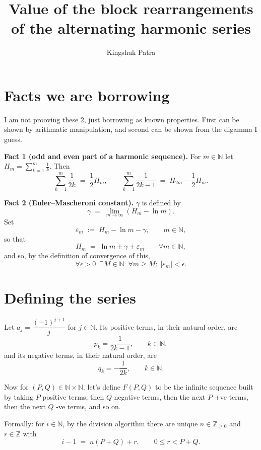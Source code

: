 \documentclass[11pt]{article}
\title{Value of the block rearrangements of the alternating harmonic series}
\author{Kingshuk Patra}
\date{}
\begin{document}
\maketitle

\section{Facts we are borrowing}

I am not prooving these 2, just borrowing as known properties. First can be shown by arithmatic manipulation, and second can be shown from the digamma I guess.

\medskip
\noindent\textbf{Fact 1 (odd and even part of a harmonic sequence).}
For $m \in \mathbb{N}$ let $H_m = \sum_{k=1}^{m} \frac{1}{k}$. Then
\[
\sum_{k=1}^{m} \frac{1}{2k} \;=\; \frac{1}{2} H_m ,
\qquad
\sum_{k=1}^{m} \frac{1}{2k-1} \;=\; H_{2m} - \frac{1}{2} H_m .
\]

\medskip
\noindent\textbf{Fact 2 (Euler--Mascheroni constant).}
$\gamma$ is defined by
\[
\gamma \;=\; \lim_{m \to \infty} \left( H_m - \ln m \right).
\]
Set
\[
\varepsilon_m \;:=\; H_m - \ln m - \gamma , \qquad m \in \mathbb{N},
\]
so that
\begin{equation}\label{eq:Hexp}
H_m \;=\; \ln m + \gamma + \varepsilon_m \qquad \forall m \in \mathbb{N},
\end{equation}
and so, by the definition of convergence of this,
\begin{equation}\label{eq:epsdef}
\forall \epsilon > 0 \;\; \exists M \in \mathbb{N} \;\; \forall m \ge M : \;
\left| \varepsilon_m \right| < \epsilon .
\end{equation}


\section{Defining the series}

Let $a_j = \dfrac{(-1)^{j+1}}{j}$ for $j \in \mathbb{N}$. Its positive terms, in their
natural order, are
\[
p_k = \frac{1}{2k-1}, \qquad k \in \mathbb{N},
\]
and its negative terms, in their natural order, are
\[
q_k = -\frac{1}{2k}, \qquad k \in \mathbb{N}.
\]

Now for $(P,Q) \in \mathbb{N} \times \mathbb{N}$. let's define $F(P,Q)$ to be the infinite sequence
built by taking $P$ positive terms, then $Q$ negative terms, then the next $P$ +ve
terms, then the next $Q$ -ve terms, and so on.

Formally: for $i \in \mathbb{N}$, by the division algorithm there are unique
$n \in \mathbb{Z}_{\ge 0}$ and $r \in \mathbb{Z}$ with
\[
i - 1 \;=\; n(P+Q) + r, \qquad 0 \le r < P+Q .
\]
\end{document}
